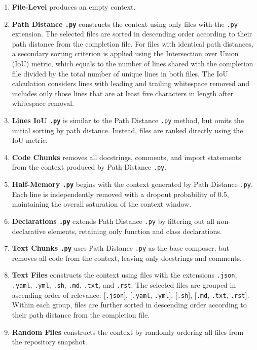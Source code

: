 \label{appendix:context-composers}
\begin{enumerate}
    \item \textbf{File-Level} produces an empty context.
    \item \textbf{Path Distance \texttt{.py}} constructs the context using only files with the \texttt{.py} extension. The selected files are sorted in descending order according to their path distance from the completion file. For files with identical path distances, a secondary sorting criterion is applied using the Intersection over Union (IoU) metric, which equals to the number of lines shared with the completion file divided by the total number of unique lines in both files. The IoU calculation considers lines with leading and trailing whitespace removed and includes only those lines that are at least five characters in length after whitespace removal.
    \item \textbf{Lines IoU \texttt{.py}} is similar to the Path Distance \texttt{.py} method, but omits the initial sorting by path distance. Instead, files are ranked directly using the IoU metric.
    \item \textbf{Code Chunks} removes all docstrings, comments, and import statements from the context produced by Path Distance \texttt{.py}.
    \item \textbf{Half-Memory \texttt{.py}} begins with the context generated by Path Distance \texttt{.py}. Each line is independently removed with a dropout probability of \(0.5\), maintaining the overall saturation of the context window.
    \item \textbf{Declarations \texttt{.py}} extends Path Distance \texttt{.py} by filtering out all non-declarative elements, retaining only function and class declarations.
    \item \textbf{Text Chunks \texttt{.py}} uses Path Distance \texttt{.py} as the base composer, but removes all code from the context, leaving only docstrings and comments.
    \item \textbf{Text Files} constructs the context using files with the extensions \texttt{.json}, \texttt{.yaml}, \texttt{.yml}, \texttt{.sh}, \texttt{.md}, \texttt{.txt}, and \texttt{.rst}. The selected files are grouped in ascending order of relevance: [\texttt{.json}], [\texttt{.yaml}, \texttt{.yml}], [\texttt{.sh}], [\texttt{.md}, \texttt{.txt}, \texttt{.rst}]. Within each group, files are further sorted in descending order according to their path distance from the completion file.
    \item \textbf{Random Files} constructs the context by randomly ordering all files from the repository snapshot.

\end{enumerate}
